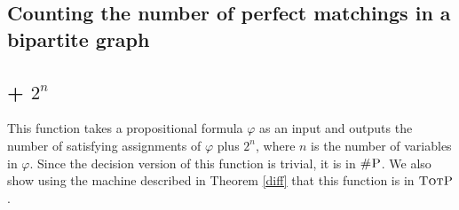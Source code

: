 \subsection{Counting the number of perfect matchings in a bipartite graph}

\subsection{\shsat + $2^n$}

This function takes a propositional formula $\varphi$ as an input and outputs the number of satisfying assignments of $\varphi$ plus $2^n$, where $n$ is the number of variables in $\varphi$. Since the decision version of this function is trivial, it is in $\textsc{\#P}$. We also show using the machine described in Theorem \ref{diff} that this function is in $\textsc{TotP}$.